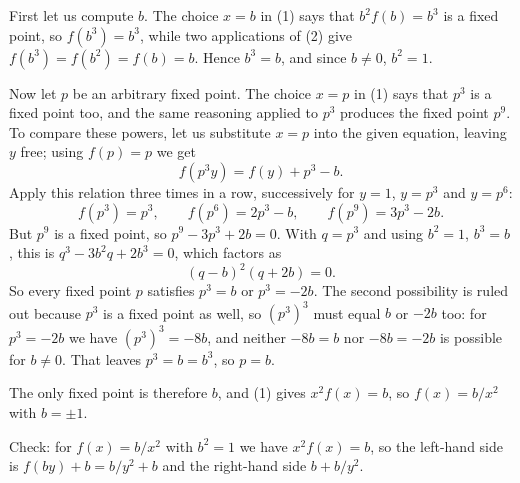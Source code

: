 {    First let us compute $b$. The choice $x=b$ in (1) says that $b^2f(b)=b^3$ is a fixed point, so $f(b^3)=b^3$, while two applications of (2) give $f(b^3)=f(b^2)=f(b)=b$. Hence $b^3=b$, and since $b\neq0$, $b^2=1$.

    Now let $p$ be an arbitrary fixed point. The choice $x=p$ in (1) says that $p^3$ is a fixed point too, and the same reasoning applied to $p^3$ produces the fixed point $p^9$. To compare these powers, let us substitute $x=p$ into the given equation, leaving $y$ free; using $f(p)=p$ we get
    $$
    f(p^3y) = f(y)+p^3-b.
    $$
    Apply this relation three times in a row, successively for $y=1$, $y=p^3$ and $y=p^6$:
    $$
    f(p^3)=p^3,\qquad f(p^6)=2p^3-b,\qquad f(p^9)=3p^3-2b.
    $$
    But $p^9$ is a fixed point, so $p^9-3p^3+2b=0$. With $q=p^3$ and using $b^2=1$, $b^3=b$, this is $q^3-3b^2q+2b^3=0$, which factors as
    $$
    (q-b)^2(q+2b) = 0.
    $$
    So every fixed point $p$ satisfies $p^3=b$ or $p^3=-2b$. The second possibility is ruled out because $p^3$ is a fixed point as well, so $(p^3)^3$ must equal $b$ or $-2b$ too: for $p^3=-2b$ we have $(p^3)^3=-8b$, and neither $-8b=b$ nor $-8b=-2b$ is possible for $b\neq0$. That leaves $p^3=b=b^3$, so $p=b$.

    The only fixed point is therefore $b$, and (1) gives $x^2f(x)=b$, so $f(x)=b/x^2$ with $b=\pm1$.

    Check: for $f(x)=b/x^2$ with $b^2=1$ we have $x^2f(x)=b$, so the left-hand side is $f(by)+b=b/y^2+b$ and the right-hand side $b+b/y^2$.
}

